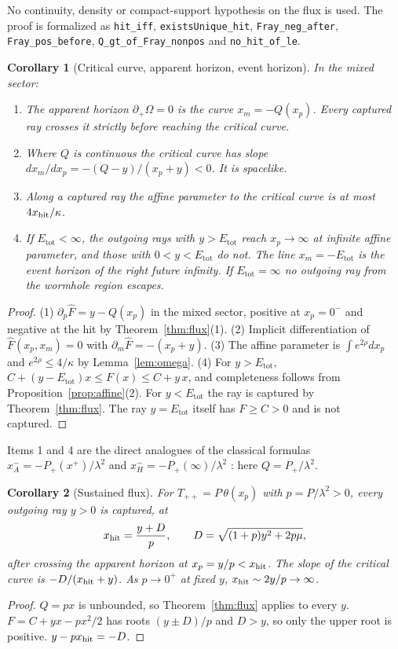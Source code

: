 \documentclass[11pt]{article}
\newtheorem{corollary}{Corollary}
\theoremstyle{remark}
\newcommand{\Etot}{E_{\mathrm{tot}}}
\newcommand{\Fh}{\widehat F}
\newcommand{\lean}[1]{\texttt{#1}}
\begin{document}
No continuity, density or compact-support hypothesis on the flux is used. The proof is formalized as \lean{hit\_iff}, \lean{existsUnique\_hit}, \lean{Fray\_neg\_after}, \lean{Fray\_pos\_before}, \lean{Q\_gt\_of\_Fray\_nonpos} and \lean{no\_hit\_of\_le}.

\begin{corollary}[Critical curve, apparent horizon, event horizon]\label{cor:horizon}
In the mixed sector:
\begin{enumerate}
\item The apparent horizon $\partial_+\Omega=0$ is the curve $x_m=-Q(x_p)$. Every captured ray crosses it strictly before reaching the critical curve.
\item Where $Q$ is continuous the critical curve has slope $dx_m/dx_p=-(Q-y)/(x_p+y)<0$. It is spacelike.
\item Along a captured ray the affine parameter to the critical curve is at most $4x_{\rm hit}/\kappa$.
\item If $\Etot<\infty$, the outgoing rays with $y>\Etot$ reach $x_p\to\infty$ at infinite affine parameter, and those with $0<y<\Etot$ do not. The line $x_m=-\Etot$ is the event horizon of the right future infinity. If $\Etot=\infty$ no outgoing ray from the wormhole region escapes.
\end{enumerate}
\end{corollary}
\begin{proof}
(1) $\partial_p\Fh=y-Q(x_p)$ in the mixed sector, positive at $x_p=0^-$ and negative at the hit by Theorem~\ref{thm:flux}(1). (2) Implicit differentiation of $\Fh(x_p,x_m)=0$ with $\partial_m\Fh=-(x_p+y)$. (3) The affine parameter is $\int e^{2\rho}dx_p$ and $e^{2\rho}\le4/\kappa$ by Lemma~\ref{lem:omega}. (4) For $y>\Etot$, $C+(y-\Etot)x\le F(x)\le C+y\,x$, and completeness follows from Proposition~\ref{prop:affine}(2). For $y<\Etot$ the ray is captured by Theorem~\ref{thm:flux}. The ray $y=\Etot$ itself has $F\ge C>0$ and is not captured.
\end{proof}

Items 1 and 4 are the direct analogues of the classical formulas $x^-_A=-P_+(x^+)/\lambda^2$ and $x^-_H=-P_+(\infty)/\lambda^2$ \cite{Thorlacius}: here $Q=P_+/\lambda^2$.

\begin{corollary}[Sustained flux]\label{cor:sustained}
For $T_{++}=P\,\theta(x_p)$ with $p=P/\lambda^2>0$, every outgoing ray $y>0$ is captured, at
\begin{equation}\label{eq:xhit}
x_{\rm hit}=\frac{y+D}{p},\qquad D=\sqrt{(1+p)y^2+2p\mu},
\end{equation}
after crossing the apparent horizon at $x_p=y/p<x_{\rm hit}$. The slope of the critical curve is $-D/(x_{\rm hit}+y)$. As $p\to0^+$ at fixed $y$, $x_{\rm hit}\sim 2y/p\to\infty$.
\end{corollary}
\begin{proof}
$Q=px$ is unbounded, so Theorem~\ref{thm:flux} applies to every $y$. $F=C+yx-px^2/2$ has roots $(y\pm D)/p$ and $D>y$, so only the upper root is positive. $y-px_{\rm hit}=-D$.
\end{proof}
\end{document}
